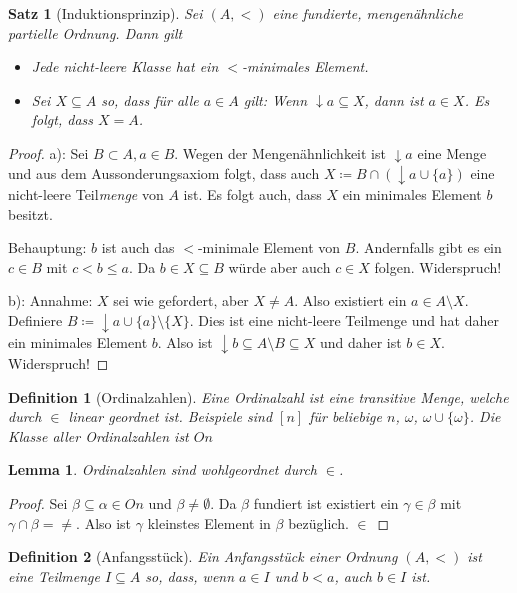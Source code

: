 \documentclass[german]{article}
\theoremstyle{break}
\theoremstyle{def_style}
\newtheorem{definition}{Definition}[section]
\theoremstyle{def_style}
\newtheorem{satz}{Satz}[section]
\theoremstyle{lemma_style}
\newtheorem{lemma}{Lemma}[subsection]
\begin{document}
\begin{satz}[Induktionsprinzip]
	Sei $(A,<)$ eine fundierte, mengenähnliche partielle Ordnung. Dann gilt
	\begin{itemize}
		\item[a)] Jede nicht-leere Klasse hat ein $<$-minimales Element.
		\item[b)] Sei $X\subseteq A$ so, dass für alle $a\in A$ gilt: Wenn $\downarrow a \subseteq X$, dann ist $a\in X$. Es folgt, dass $X=A$.
	\end{itemize}
\end{satz}
\begin{proof}
	a): Sei $B\subset A, a\in B$. Wegen der Mengenähnlichkeit ist $\downarrow a$ eine Menge und aus dem Aussonderungsaxiom folgt, dass auch $X\coloneqq B \cap (\downarrow a \cup \{a\})$ eine nicht-leere Teil\textit{menge} von $A$ ist. Es folgt auch, dass $X$ ein minimales Element $b$ besitzt. 
	
	Behauptung: $b$ ist auch das $<$-minimale Element von $B$. Andernfalls gibt es ein $c\in B$ mit $c < b \leq a$. Da $b\in X \subseteq B$ würde aber auch $c\in X$ folgen. Widerspruch!
	
	b): Annahme: $X$ sei wie gefordert, aber $X\neq A$. Also existiert ein $a\in A\setminus X$. Definiere $B\coloneqq \downarrow a \cup \{a\} \setminus \{X\}$. Dies ist eine nicht-leere Teilmenge und hat daher ein minimales Element $b$. Also ist $\downarrow b\subseteq A\setminus B\subseteq X$ und daher ist $b\in X$. Widerspruch!
\end{proof}

\begin{definition}[Ordinalzahlen]
	Eine \textit{Ordinalzahl} ist eine transitive Menge, welche durch $\in$ linear geordnet ist. 
	Beispiele sind $[n]$ für beliebige $n$, $\omega$, $\omega \cup \{\omega\}$. Die Klasse aller Ordinalzahlen ist $On$
\end{definition}

\begin{lemma}
	Ordinalzahlen sind wohlgeordnet durch $\in$.
\end{lemma}
\begin{proof}
	Sei $\beta\subseteq \alpha\in On$ und $\beta\neq \emptyset$. Da $\beta$ fundiert ist existiert ein $\gamma\in \beta$ mit $\gamma\cap \beta =\neq$. Also ist $\gamma$ kleinstes Element in $\beta$ bezüglich. $\in$
\end{proof}

\begin{definition}[Anfangsstück]
	Ein \textit{Anfangsstück} einer Ordnung $(A,<)$ ist eine Teilmenge $I\subseteq A$ so, dass, wenn $a\in I$ und $b<a$, auch $b\in I$ ist.
\end{definition}
\end{document}
